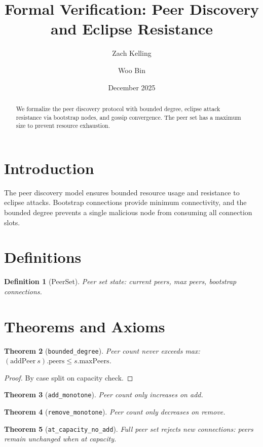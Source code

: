 \documentclass[11pt]{article}
\title{Formal Verification: Peer Discovery and Eclipse Resistance}
\author{Zach Kelling \and Woo Bin}
\date{December 2025}
\newtheorem{theorem}{Theorem}
\newtheorem{definition}[theorem]{Definition}
\begin{document}
\maketitle

\begin{abstract}
We formalize the peer discovery protocol with bounded degree, eclipse attack resistance via bootstrap nodes, and gossip convergence. The peer set has a maximum size to prevent resource exhaustion.
\end{abstract}

\section{Introduction}
The peer discovery model ensures bounded resource usage and resistance to eclipse attacks. Bootstrap connections provide minimum connectivity, and the bounded degree prevents a single malicious node from consuming all connection slots.

\section{Definitions}
\begin{definition}[PeerSet]
Peer set state: current peers, max peers, bootstrap connections.
\end{definition}


\section{Theorems and Axioms}
\begin{theorem}[\texttt{bounded\_degree}]
Peer count never exceeds max: $(\text{addPeer}~s).\text{peers} \leq s.\text{maxPeers}$.
\end{theorem}
\begin{proof}
By case split on capacity check.
\end{proof}

\begin{theorem}[\texttt{add\_monotone}]
Peer count only increases on add.
\end{theorem}

\begin{theorem}[\texttt{remove\_monotone}]
Peer count only decreases on remove.
\end{theorem}

\begin{theorem}[\texttt{at\_capacity\_no\_add}]
Full peer set rejects new connections: peers remain unchanged when at capacity.
\end{theorem}
\end{document}
